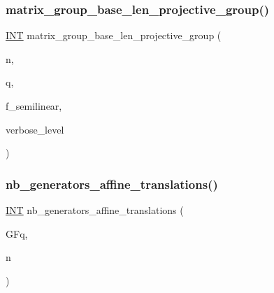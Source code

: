 \subsubsection{\texorpdfstring{matrix\+\_\+group\+\_\+base\+\_\+len\+\_\+projective\+\_\+group()}{matrix\_group\_base\_len\_projective\_group()}}
{\footnotesize\ttfamily \mbox{\hyperlink{galois_8h_a09fddde158a3a20bd2dcadb609de11dc}{I\+NT}} matrix\+\_\+group\+\_\+base\+\_\+len\+\_\+projective\+\_\+group (\begin{DoxyParamCaption}\item[{\mbox{\hyperlink{galois_8h_a09fddde158a3a20bd2dcadb609de11dc}{I\+NT}}}]{n,  }\item[{\mbox{\hyperlink{galois_8h_a09fddde158a3a20bd2dcadb609de11dc}{I\+NT}}}]{q,  }\item[{\mbox{\hyperlink{galois_8h_a09fddde158a3a20bd2dcadb609de11dc}{I\+NT}}}]{f\+\_\+semilinear,  }\item[{\mbox{\hyperlink{galois_8h_a09fddde158a3a20bd2dcadb609de11dc}{I\+NT}}}]{verbose\+\_\+level }\end{DoxyParamCaption})}

\mbox{\label{group__generators_8_c_acb0fbc4831d1c95abdb7ee8c123f5d01}} 
\subsubsection{\texorpdfstring{nb\+\_\+generators\+\_\+affine\+\_\+translations()}{nb\_generators\_affine\_translations()}}
{\footnotesize\ttfamily \mbox{\hyperlink{galois_8h_a09fddde158a3a20bd2dcadb609de11dc}{I\+NT}} nb\+\_\+generators\+\_\+affine\+\_\+translations (\begin{DoxyParamCaption}\item[{\mbox{\hyperlink{classfinite__field}{finite\+\_\+field}} \&}]{G\+Fq,  }\item[{\mbox{\hyperlink{galois_8h_a09fddde158a3a20bd2dcadb609de11dc}{I\+NT}}}]{n }\end{DoxyParamCaption})}

\mbox{\label{group__generators_8_c_ad44a004f3a5ff15b3ac8f1fb6dc0c090}} 
